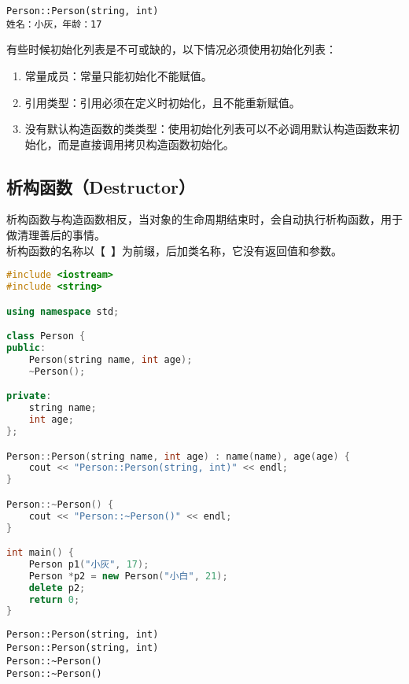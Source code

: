 \begin{tcolorbox}
	\begin{verbatim}
Person::Person(string, int)
姓名：小灰，年龄：17
	\end{verbatim}
\end{tcolorbox}

有些时候初始化列表是不可或缺的，以下情况必须使用初始化列表：

\begin{enumerate}
	\item 常量成员：常量只能初始化不能赋值。
	\item 引用类型：引用必须在定义时初始化，且不能重新赋值。
	\item 没有默认构造函数的类类型：使用初始化列表可以不必调用默认构造函数来初始化，而是直接调用拷贝构造函数初始化。
\end{enumerate}

\subsection{析构函数（Destructor）}

析构函数与构造函数相反，当对象的生命周期结束时，会自动执行析构函数，用于做清理善后的事情。 \\

析构函数的名称以【~】为前缀，后加类名称，它没有返回值和参数。 \\


\begin{lstlisting}[language=C++]
#include <iostream>
#include <string>

using namespace std;

class Person {
public:
    Person(string name, int age);
    ~Person();

private:
    string name;
    int age;
};

Person::Person(string name, int age) : name(name), age(age) {
    cout << "Person::Person(string, int)" << endl;
}

Person::~Person() {
    cout << "Person::~Person()" << endl;
}

int main() {
    Person p1("小灰", 17);
    Person *p2 = new Person("小白", 21);
    delete p2;
    return 0;
}
\end{lstlisting}

\begin{tcolorbox}
	\begin{verbatim}
Person::Person(string, int)
Person::Person(string, int)
Person::~Person()
Person::~Person()
	\end{verbatim}
\end{tcolorbox}


